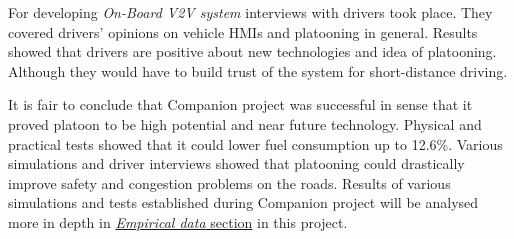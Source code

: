 % 
For developing \emph{On-Board V2V system} interviews with drivers took place. They covered drivers' opinions on vehicle \acrshort{HMI}s and platooning in general. Results showed that drivers are positive about new technologies and idea of platooning. Although they would have to build trust of the system for short-distance driving.\par
% 
It is fair to conclude that Companion project was successful in sense that it proved platoon to be high potential and near future technology. Physical and practical tests showed that it could lower fuel consumption up to 12.6\%. Various simulations and driver interviews showed that platooning could drastically improve safety and congestion problems on the roads. Results of various simulations and tests established during Companion project will be analysed more in depth in \hyperref[sec:data]{\textit{Empirical data} section} in this project.
% 